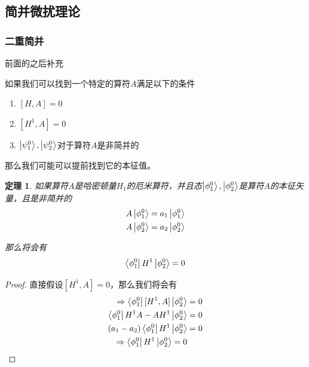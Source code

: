 \documentclass{article}
\newtheorem{theorem}{定理}
\begin{document}
\subsection{简并微扰理论}
\subsubsection{二重简并}

前面的之后补充

如果我们可以找到一个特定的算符$A$满足以下的条件
\begin{enumerate}
    \item $[H,A]=0$
    \item $[H^1,A]=0$
    \item $\ket{\psi_1^0},\ket{\psi_2^0}$对于算符$A$是非简并的
\end{enumerate}

那么我们可能可以提前找到它的本征值。

\begin{theorem}
    如果算符$A$是哈密顿量$H_1$的厄米算符，并且态$\ket{\phi_1^0},\ket{\phi_2^0}$是算符$A$的本征矢量，且是非简并的
    \begin{align*}
        A\ket{\phi_1^0}=a_1\ket{\phi_1^0}\\
        A\ket{\phi_2^0}=a_2\ket{\phi_2^0}
    \end{align*}

    那么将会有
    \begin{align*}
        \bra{\phi_1^0}H^1\ket{\phi_2^0}=0
    \end{align*}
\end{theorem}

\begin{proof}
    直接假设$[H^1,A]=0$，那么我们将会有
    \begin{align*}
        \Rightarrow \bra{\phi_1^0}[H^1,A]\ket{\phi_2^0}&=0\\
        \bra{\phi_1^0}H^1A-AH^1\ket{\phi_2^0}&=0\\
        (a_1-a_2)\bra{\phi_1^0}H^1\ket{\phi_2^0}&=0\\
        \Rightarrow \bra{\phi_1^0}H^1\ket{\phi_2^0}=0
    \end{align*}
\end{proof}
\end{document}
